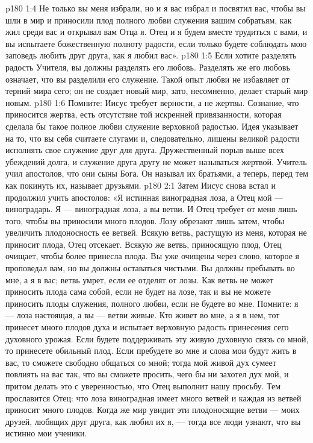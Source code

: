 \vs p180 1:4 Не только вы меня избрали, но и я вас избрал и посвятил вас, чтобы вы шли в мир и приносили плод полного любви служения вашим собратьям, как жил среди вас и открывал вам Отца я. Отец и я будем вместе трудиться с вами, и вы испытаете божественную полноту радости, если только будете соблюдать мою заповедь любить друг друга, как я любил вас».
\vs p180 1:5 \pc Если хотите разделять радость Учителя, вы должны разделять его любовь. Разделять же его любовь означает, что вы разделили его служение. Такой опыт любви не избавляет от терний мира сего; он не создает новый мир, зато, несомненно, делает старый мир новым.
\vs p180 1:6 Помните: Иисус требует верности, а не жертвы. Сознание, что приносится жертва, есть отсутствие той искренней привязанности, которая сделала бы такое полное любви служение верховной радостью. Идея  указывает на то, что вы себя считаете слугами и, следовательно, лишены великой радости исполнять свое служение друг для друга. Дружественный порыв выше всех убеждений долга, и служение друга другу не может называться жертвой. Учитель учил апостолов, что они сыны Бога. Он называл их братьями, а теперь, перед тем как покинуть их, называет друзьями.
\vs p180 2:1 Затем Иисус снова встал и продолжил учить апостолов: «Я истинная виноградная лоза, а Отец мой --- виноградарь. Я --- виноградная лоза, а вы ветви. И Отец требует от меня лишь того, чтобы вы приносили много плодов. Лозу обрезают лишь затем, чтобы увеличить плодоносность ее ветвей. Всякую ветвь, растущую из меня, которая не приносит плода, Отец отсекает. Всякую же ветвь, приносящую плод, Отец очищает, чтобы более принесла плода. Вы уже очищены через слово, которое я проповедал вам, но вы должны оставаться чистыми. Вы должны пребывать во мне, а я в вас; ветвь умрет, если ее отделят от лозы. Как ветвь не может приносить плода сама собой, если не будет на лозе, так и вы не можете приносить плоды служения, полного любви, если не будете во мне. Помните: я --- лоза настоящая, а вы --- ветви живые. Кто живет во мне, а я в нем, тот принесет много плодов духа и испытает верховную радость принесения сего духовного урожая. Если будете поддерживать эту живую духовную связь со мной, то принесете обильный плод. Если пребудете во мне и слова мои будут жить в вас, то сможете свободно общаться со мной; тогда мой живой дух сумеет повлиять на вас так, что вы сможете просить, чего бы ни захотел дух мой, и притом делать это с уверенностью, что Отец выполнит нашу просьбу. Тем прославится Отец: что лоза виноградная имеет много ветвей и каждая из ветвей приносит много плодов. Когда же мир увидит эти плодоносящие ветви --- моих друзей, любящих друг друга, как любил их я, --- тогда все люди узнают, что вы истинно мои ученики.

